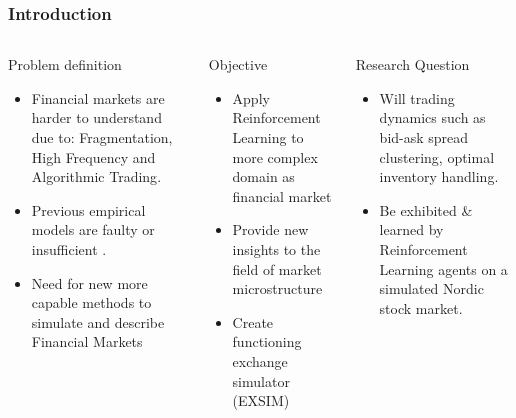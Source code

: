 \documentclass[aspectratio=1610]{beamer}
\begin{document}
\begin{frame}
  \frametitle{\hfill Introduction}
  
 \begin{columns}[t]
    \begin{block}{Problem definition}
    \begin{small}
    \begin{itemize}
        \item Financial markets are harder to understand due to: \alert{Fragmentation}, \alert{High Frequency} and \alert{Algorithmic Trading}.
        \item Previous empirical models are faulty or insufficient \parencite{o2015high}.
        \item Need for new more capable methods to simulate and describe Financial Markets 
        \end{itemize}
    \end{small}
    \end{block}
    \begin{block}{Objective}
    \begin{small}
    \begin{itemize}
        \item Apply Reinforcement Learning to more complex domain as financial market
        \item Provide new insights to the field of market microstructure
        \item Create functioning exchange simulator (EXSIM)
        \end{itemize}
    \end{small}
    \end{block}
    \begin{block}{Research Question}
    \begin{small}
     \begin{itemize}
        \item Will trading dynamics such as \alert{bid-ask spread clustering}, \alert{optimal inventory handling}.
        \item  Be exhibited \& learned by \alert{Reinforcement Learning} agents on a simulated Nordic stock market.
        \end{itemize}
    \end{small}
    \end{block}
\end{columns}

\end{frame}
\end{document}

